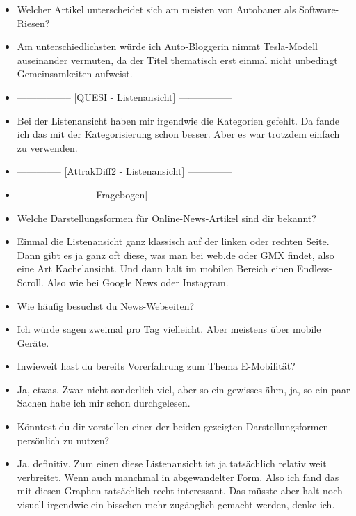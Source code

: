 {\begin{itemize}[]
        \item {} Welcher Artikel unterscheidet sich am meisten von \flqq Autobauer als Software-Riesen\frqq{}?
        \item {} Am unterschiedlichsten würde ich \flqq Auto-Bloggerin nimmt Tesla-Modell auseinander\frqq{} vermuten, da der Titel thematisch erst einmal nicht unbedingt Gemeinsamkeiten aufweist.
        \item {-----------------} [QUESI - Listenansicht] {-----------------}
        \item {} Bei der Listenansicht haben mir irgendwie die Kategorien gefehlt.
              Da fande ich das mit der Kategorisierung schon besser.
              Aber es war trotzdem einfach zu verwenden.
        \item {--------------} [AttrakDiff2 - Listenansicht] {--------------}
        \item {-----------------------} [Fragebogen] {----------------------}
        \item {} Welche Darstellungsformen für Online-News-Artikel sind dir bekannt?
        \item {} Einmal die Listenansicht ganz klassisch auf der linken oder rechten Seite.
        Dann gibt es ja ganz oft diese, was man bei web.de oder GMX findet, also eine Art Kachelansicht.
        Und dann halt im mobilen Bereich einen Endless-Scroll.
        Also wie bei Google News oder Instagram.
        \item {} Wie häufig besuchst du News-Webseiten?
        \item {} Ich würde sagen zweimal pro Tag vielleicht. Aber meistens über mobile Geräte.
        \item {} Inwieweit hast du bereits Vorerfahrung zum Thema E-Mobilität?
        \item {} Ja, etwas. Zwar nicht sonderlich viel, aber so ein gewisses ähm, ja, so ein paar Sachen habe ich mir schon durchgelesen.
        \item {} Könntest du dir vorstellen einer der beiden gezeigten Darstellungsformen persönlich zu nutzen?
        \item {} Ja, definitiv. Zum einen diese Listenansicht ist ja tatsächlich relativ weit verbreitet.
        Wenn auch manchmal in abgewandelter Form.
        Also ich fand das mit diesen Graphen tatsächlich recht interessant.
        Das müsste aber halt noch visuell irgendwie ein bisschen mehr zugänglich gemacht werden, denke ich.

\end{itemize}}
